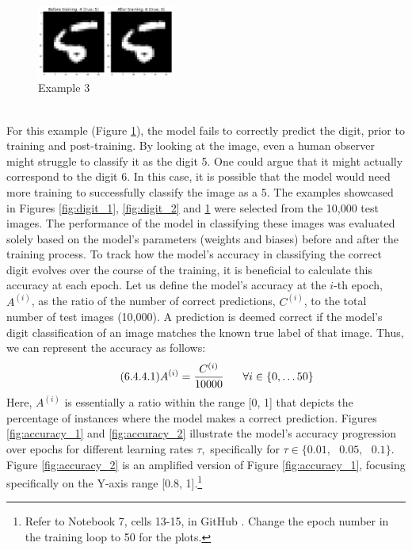 \begin{figure}[h!]
    \centering
        \includegraphics[width=0.40\textwidth]{Pictures/digit_3.png}
    \caption{Example 3}\label{fig:digit_3}
\end{figure}\\
For this example (Figure \ref{fig:digit_3}), the model fails to correctly predict the digit, prior to training and post-training. By looking at the image, even a human observer might struggle to classify it as the digit 5. One could argue that it might actually correspond to the digit 6. In this case, it is possible that the model would need more training to successfully classify the image as a 5. The examples showcased in Figures \ref{fig:digit_1}, \ref{fig:digit_2} and \ref{fig:digit_3} were selected from the 10,000 test images. The performance of the model in classifying these images was evaluated solely based on the model's parameters (weights and biases) before and after the training process. To track how the model's accuracy in classifying the correct digit evolves over the course of the training, it is beneficial to calculate this accuracy at each epoch. Let us define the model's accuracy at the $i$-th epoch, $A^{(i)}$, as the ratio of the number of correct predictions, $C^{(i)}$, to the total number of test images (10,000). A prediction is deemed correct if the model's digit classification of an image matches the known true label of that image. Thus, we can represent the accuracy as follows:
\begin{equation*}\tag{6.4.4.1}
A^{(i)} = \frac{C^{(i)}}{10000} \hspace{0.6cm} \forall i \in \{0,\ldots50\}
\end{equation*}
Here, $A^{(i)}$ is essentially a ratio within the range [0, 1] that depicts the percentage of instances where the model makes a correct prediction. Figures \ref{fig:accuracy_1} and \ref{fig:accuracy_2} illustrate the model's accuracy progression over epochs for different learning rates $\tau,$ specifically for $\tau \in \{0.01,\text{ }0.05,\text{ }0.1\}.$ Figure \ref{fig:accuracy_2} is an amplified version of Figure \ref{fig:accuracy_1}, focusing specifically on the Y-axis range [0.8, 1].\footnote{Refer to Notebook 7, cells 13-15, in GitHub \cite{ThesisCode2023}. Change the epoch number in the training loop to 50 for the plots.}
